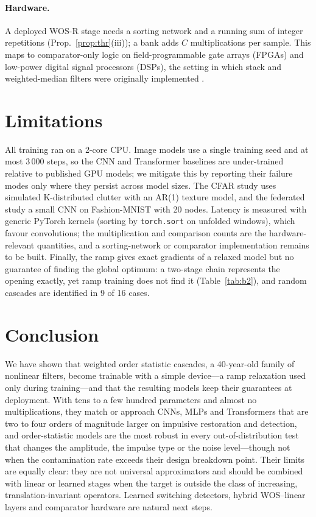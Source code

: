 \documentclass[11pt,a4paper]{article}
\theoremstyle{definition}
\theoremstyle{remark}
\begin{document}
\paragraph{Hardware.} A deployed WOS-R stage needs a sorting network and a running sum of integer repetitions
(Prop.~\ref{prop:thr}(iii)); a bank adds $C$ multiplications per sample. This maps to comparator-only logic on field-programmable gate arrays (FPGAs) and
low-power digital signal processors (DSPs), the setting in which stack and weighted-median filters were originally implemented \cite{wendt1986stack,yin1996}.

\section{Limitations}
All training ran on a 2-core CPU. Image models use a single training seed and at most 3\,000 steps, so the CNN and
Transformer baselines are under-trained relative to published GPU models; we mitigate this by reporting their failure
modes only where they persist across model sizes. The CFAR study uses simulated K-distributed clutter with an AR(1)
texture model, and the federated study a small CNN on Fashion-MNIST \cite{xiao2017fmnist} with 20 nodes. Latency is
measured with generic PyTorch kernels (sorting by \texttt{torch.sort} on unfolded windows), which favour convolutions;
the multiplication and comparison counts are the hardware-relevant quantities, and a sorting-network or comparator
implementation remains to be built. Finally, the ramp gives exact gradients of a relaxed model but no guarantee of
finding the global optimum: a two-stage chain represents the opening exactly, yet ramp training does not find it
(Table~\ref{tab:b2}), and random cascades are identified in 9 of 16 cases.

\section{Conclusion}
We have shown that weighted order statistic cascades, a 40-year-old family of nonlinear filters, become trainable with a
simple device---a ramp relaxation used only during training---and that the resulting models keep their guarantees at
deployment. With tens to a few hundred parameters and almost no multiplications, they match or approach CNNs, MLPs
and Transformers that are two to four orders of magnitude larger on impulsive restoration and detection, and order-statistic models are
the most robust in every out-of-distribution test that changes the amplitude, the impulse type or the noise
level---though not when the contamination rate exceeds their design breakdown point. Their limits are equally clear: they are not
universal approximators and should be combined with linear or learned stages when the target is outside the class of
increasing, translation-invariant operators. Learned switching detectors, hybrid WOS--linear layers and comparator
hardware are natural next steps.
\end{document}
